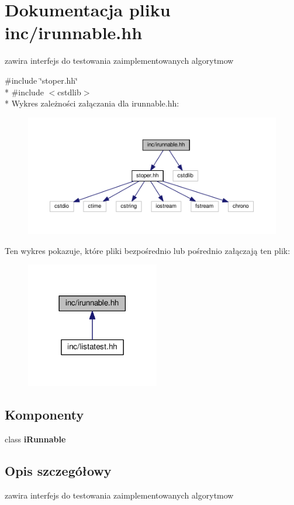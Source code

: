 \section{Dokumentacja pliku inc/irunnable.hh}
\label{irunnable_8hh}


zawira interfejs do testowania zaimplementowanych algorytmow  


{\ttfamily \#include \char`\"{}stoper.\+hh\char`\"{}}\\*
{\ttfamily \#include $<$cstdlib$>$}\\*
Wykres zależności załączania dla irunnable.\+hh\+:
\nopagebreak
\begin{figure}[H]
\begin{center}
\leavevmode
\includegraphics[width=350pt]{irunnable_8hh__incl}
\end{center}
\end{figure}
Ten wykres pokazuje, które pliki bezpośrednio lub pośrednio załączają ten plik\+:
\nopagebreak
\begin{figure}[H]
\begin{center}
\leavevmode
\includegraphics[width=165pt]{irunnable_8hh__dep__incl}
\end{center}
\end{figure}
\subsection*{Komponenty}
\begin{DoxyCompactItemize}
\item 
class {\bf i\+Runnable}
\end{DoxyCompactItemize}


\subsection{Opis szczegółowy}
zawira interfejs do testowania zaimplementowanych algorytmow 

